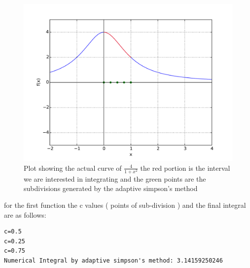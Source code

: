 \documentclass[a4paper,11pt]{article}
\begin{document}
\begin{figure}[ht]
	\center
	\includegraphics[scale=0.45]{ex5_fig1.pdf}
    \caption{Plot showing the actual curve of $\frac{4}{1+x^2}$ the red portion is the interval we are interested in integrating and the green points are the subdivisions generated by the adaptive simpson's method}
	\label{fig:fig1}
\end{figure}
for the first function the c values ( points of sub-division ) and the final integral are as follows:
\begin{lstlisting}
c=0.5
c=0.25
c=0.75
Numerical Integral by adaptive simpson's method: 3.14159250246
\end{lstlisting}
\end{document}
